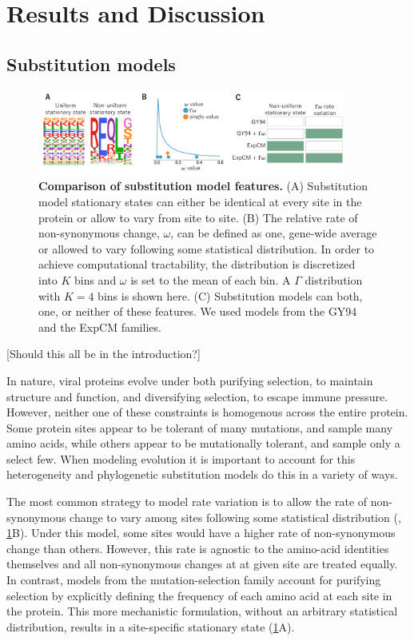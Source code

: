 \documentclass[11pt]{article}
\newcommand\skhcomment[1]{{\color{cyan}[#1]}}
\begin{document}
\section*{Results and Discussion}

\subsection*{Substitution models}

\begin{figure}[H]
\centerline{\includegraphics[width=0.90\textwidth]{figures/model_feature.pdf}}
\caption{\label{fig:model_feature}
\textbf{Comparison of substitution model features.}
(A) Substitution model stationary states can either be identical at every site in the protein or allow to vary from site to site. 
(B) The relative rate of non-synonymous change, $\omega$, can be defined as one, gene-wide average or allowed to vary following some statistical distribution.
In order to achieve computational tractability, the distribution is discretized into $K$ bins and $\omega$ is set to the mean of each bin. 
A $\Gamma$ distribution with $K=4$ bins is shown here. 
(C) Substitution models can both, one, or neither of these features. 
We used models from the GY94 and the ExpCM families. 
}
\end{figure}

\skhcomment{Should this all be in the introduction?}

In nature, viral proteins evolve under both purifying selection, to maintain structure and function, and diversifying selection, to escape immune pressure. 
However, neither one of these constraints is homogenous across the entire protein. 
Some protein sites appear to be tolerant of many mutations, and sample many amino acids, while others appear to be mutationally tolerant, and sample only a select few. 
When modeling evolution it is important to account for this heterogeneity and phylogenetic substitution models do this in a variety of ways. 

The most common strategy to model rate variation is to allow the rate of non-synonymous change to vary among sites following some statistical distribution (\cite{yang1994maximum, yang2000codon}, \ref{fig:model_feature}B). 
Under this model, some sites would have a higher rate of non-synonymous change than others. 
However, this rate is agnostic to the amino-acid identities themselves and all non-synonymous changes at at given site are treated equally. 
In contrast, models from the mutation-selection family \cite{halpern1998evolutionary} account for purifying selection by explicitly defining the frequency of each amino acid at each site in the protein. 
This more mechanistic formulation, without an arbitrary statistical distribution, results in a site-specific stationary state (\ref{fig:model_feature}A). 
\end{document}
